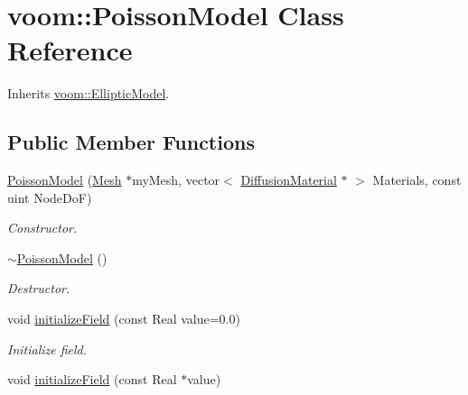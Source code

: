 \hypertarget{classvoom_1_1_poisson_model}{
\section{voom::PoissonModel Class Reference}
\label{classvoom_1_1_poisson_model}
}


Inherits \hyperlink{classvoom_1_1_elliptic_model}{voom::EllipticModel}.\subsection*{Public Member Functions}
\begin{DoxyCompactItemize}
\item 
\hypertarget{classvoom_1_1_poisson_model_abc08b62e56271ce2f4cfd51535ebea4a}{
\hyperlink{classvoom_1_1_poisson_model_abc08b62e56271ce2f4cfd51535ebea4a}{PoissonModel} (\hyperlink{classvoom_1_1_mesh}{Mesh} $\ast$myMesh, vector$<$ \hyperlink{classvoom_1_1_diffusion_material}{DiffusionMaterial} $\ast$ $>$ Materials, const uint NodeDoF)}
\label{classvoom_1_1_poisson_model_abc08b62e56271ce2f4cfd51535ebea4a}

\begin{DoxyCompactList}\small\item\em Constructor. \item\end{DoxyCompactList}\item 
\hypertarget{classvoom_1_1_poisson_model_ad86ec594230a943038a85a6ff491d200}{
\hyperlink{classvoom_1_1_poisson_model_ad86ec594230a943038a85a6ff491d200}{$\sim$PoissonModel} ()}
\label{classvoom_1_1_poisson_model_ad86ec594230a943038a85a6ff491d200}

\begin{DoxyCompactList}\small\item\em Destructor. \item\end{DoxyCompactList}\item 
\hypertarget{classvoom_1_1_poisson_model_a47a534d803f4adbd2cde4f95fcb85704}{
void \hyperlink{classvoom_1_1_poisson_model_a47a534d803f4adbd2cde4f95fcb85704}{initializeField} (const Real value=0.0)}
\label{classvoom_1_1_poisson_model_a47a534d803f4adbd2cde4f95fcb85704}

\begin{DoxyCompactList}\small\item\em Initialize field. \item\end{DoxyCompactList}\item 
\hypertarget{classvoom_1_1_poisson_model_a6ee2770be3608c762c20cb83806d98d2}{
void \hyperlink{classvoom_1_1_poisson_model_a6ee2770be3608c762c20cb83806d98d2}{initializeField} (const Real $\ast$value)}
\label{classvoom_1_1_poisson_model_a6ee2770be3608c762c20cb83806d98d2}


\end{DoxyCompactItemize}

